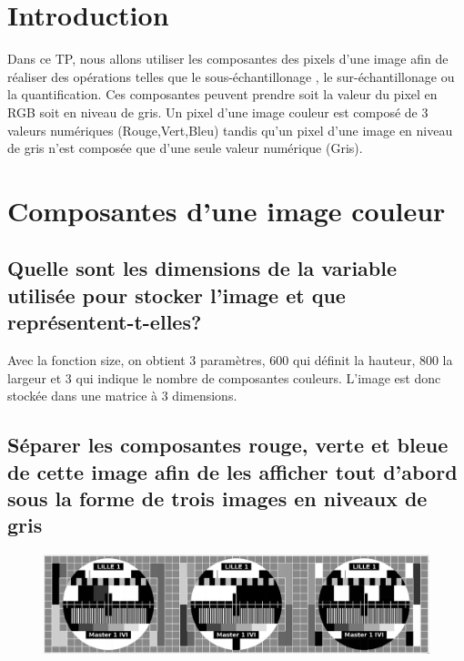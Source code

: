 \documentclass[a4paper,12pt]{report}
\begin{document}


\setcounter{page}{1} 
\newpage

\section*{Introduction}
Dans ce TP, nous allons utiliser les composantes des pixels d'une image afin de réaliser des opérations telles que le sous-échantillonage , le sur-échantillonage ou la quantification. Ces composantes peuvent prendre soit la valeur du pixel en RGB soit en niveau de gris. Un pixel d'une image couleur est composé de 3 valeurs numériques (Rouge,Vert,Bleu) tandis qu'un pixel d'une image en niveau de gris n'est composée que d'une seule valeur numérique (Gris).

\section*{Composantes d'une image couleur}

\subsection*{Quelle sont les dimensions de la variable utilisée pour stocker l'image et que représentent-t-elles?}

\noindent Avec la fonction size, on obtient 3 paramètres, 600 qui définit la hauteur, 800 la largeur et 3 qui indique le nombre de composantes couleurs. L'image est donc stockée dans une matrice à 3 dimensions.

\subsection*{Séparer les composantes rouge, verte et bleue de cette image afin de les afficher tout d'abord sous la forme de trois images en niveaux de gris}

\begin{figure}[!ht]
	\center
	\includegraphics[scale=0.4]{image/p11.png}
\end{figure}
\end{document}
